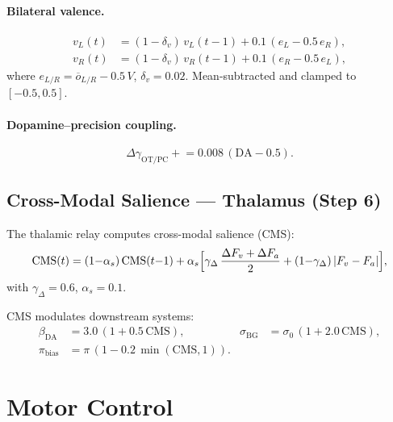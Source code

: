 \documentclass[11pt,a4paper]{article}
\begin{document}
\paragraph{Bilateral valence.}
\begin{equation}\label{eq:valence}
\begin{aligned}
  v_L(t) &= (1{-}\delta_v)\,v_L(t{-}1) + 0.1\,(e_L - 0.5\,e_R), \\
  v_R(t) &= (1{-}\delta_v)\,v_R(t{-}1) + 0.1\,(e_R - 0.5\,e_L),
\end{aligned}
\end{equation}
where $e_{L/R} = \overline{o}_{L/R} - 0.5\,V$, $\delta_v = 0.02$.
Mean-subtracted and clamped to $[-0.5, 0.5]$.

\paragraph{Dopamine--precision coupling.}
\begin{equation}\label{eq:dopa_prec}
  \Delta\gamma_{\text{OT/PC}} \mathrel{+}= 0.008\,(\text{DA} - 0.5).
\end{equation}

\subsection{Cross-Modal Salience --- Thalamus (Step 6)}

The thalamic relay computes cross-modal salience (CMS):
\begin{equation}\label{eq:cms}
  \text{CMS}(t) = (1{-}\alpha_s)\,\text{CMS}(t{-}1) + \alpha_s
  \Bigl[\gamma_\Delta\,\frac{\Delta F_v + \Delta F_a}{2}
    + (1{-}\gamma_\Delta)\,|F_v - F_a|\Bigr],
\end{equation}
with $\gamma_\Delta = 0.6$, $\alpha_s = 0.1$.

CMS modulates downstream systems:
\begin{equation}\label{eq:cms_mod}
\begin{aligned}
  \beta_\text{DA}  &= 3.0\,(1 + 0.5\,\text{CMS}), &
  \sigma_\text{BG} &= \sigma_0\,(1 + 2.0\,\text{CMS}), \\
  \pi_\text{bias}  &= \pi\,(1 - 0.2\,\min(\text{CMS},1)).
\end{aligned}
\end{equation}

\section{Motor Control}\label{sec:motor}
\end{document}
